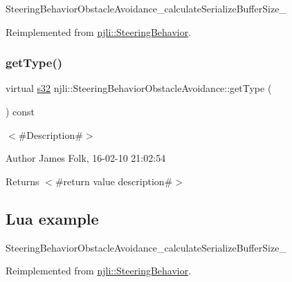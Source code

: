 \begin{DoxyCodeInclude}
\end{DoxyCodeInclude}
Steering\+Behavior\+Obstacle\+Avoidance\+\_\+calculate\+Serialize\+Buffer\+Size\+\_\+ 

Reimplemented from \mbox{\hyperlink{classnjli_1_1_steering_behavior_abb58d6982dc295fc3e90f096f51b0ef8}{njli\+::\+Steering\+Behavior}}.

\mbox{\label{classnjli_1_1_steering_behavior_obstacle_avoidance_ae16f998663452ff03bf42c7df3da7f14}} 
\subsubsection{\texorpdfstring{get\+Type()}{getType()}}
{\footnotesize\ttfamily virtual \mbox{\hyperlink{_util_8h_aa62c75d314a0d1f37f79c4b73b2292e2}{s32}} njli\+::\+Steering\+Behavior\+Obstacle\+Avoidance\+::get\+Type (\begin{DoxyParamCaption}{ }\end{DoxyParamCaption}) const\hspace{0.3cm}{\ttfamily [virtual]}}



$<$\#\+Description\#$>$ 

\begin{DoxyAuthor}{Author}
James Folk, 16-\/02-\/10 21\+:02\+:54
\end{DoxyAuthor}
\begin{DoxyReturn}{Returns}
$<$\#return value description\#$>$
\end{DoxyReturn}
\hypertarget{classnjli_1_1_steering_behavior_wander_ex1}{}\subsection{Lua example}\label{classnjli_1_1_steering_behavior_wander_ex1}

\begin{DoxyCodeInclude}
\end{DoxyCodeInclude}
Steering\+Behavior\+Obstacle\+Avoidance\+\_\+calculate\+Serialize\+Buffer\+Size\+\_\+ 

Reimplemented from \mbox{\hyperlink{classnjli_1_1_steering_behavior_ae82bca8468d41aff8c22b76fd359fe9b}{njli\+::\+Steering\+Behavior}}.

